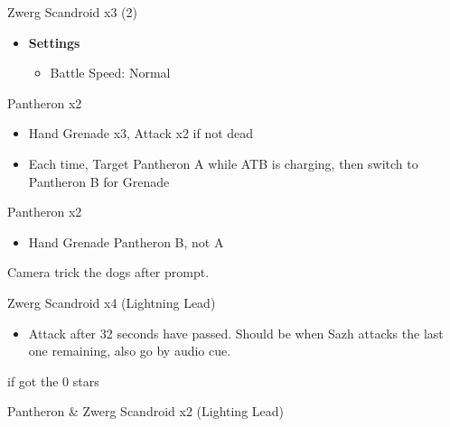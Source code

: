 \begin{paracol}{2}
\begin{battle}{Zwerg Scandroid x3 (2)}
\end{battle}
\switchcolumn
\begin{menu}
		\begin{itemize}
			\item \textbf{Settings}
			      \begin{itemize}
				      \item Battle Speed: Normal
			      \end{itemize}
		\end{itemize}
	\end{menu}
\switchcolumn
\switchcolumn*
	\begin{battle}{Pantheron x2}
		\begin{itemize}
			\item Hand Grenade x3, Attack x2 if not dead
			\item Each time, Target Pantheron A while ATB is charging, then switch to Pantheron B for Grenade
		\end{itemize}
	\end{battle}
	\switchcolumn
\begin{battle}{Pantheron x2}
\begin{itemize}
    \item Hand Grenade Pantheron B, not A
\end{itemize}
\end{battle}

\switchcolumn*

	Camera trick the dogs after prompt.

	\begin{battle}{Zwerg Scandroid x4 (Lightning Lead)}
		\begin{itemize}
			\item Attack after 32 seconds have passed. Should be when Sazh attacks the last one remaining, also go by audio cue.
		\end{itemize}
		 if got the 0 stars
	\end{battle}


	\begin{battle}{Pantheron \& Zwerg Scandroid x2 (Lighting Lead)}
	\end{battle}



\end{paracol}
